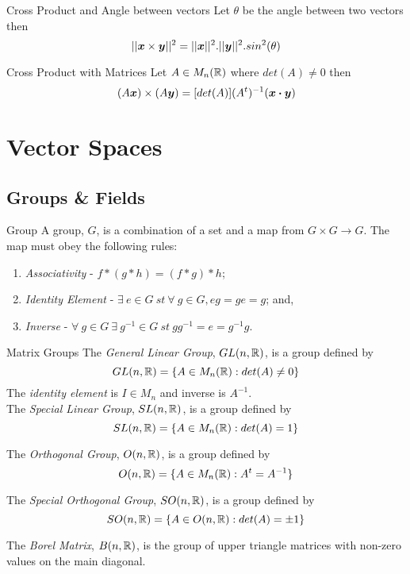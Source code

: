 \documentclass[11pt,a4paper]{article}
\begin{document}
\subtitle{Theorem 6.17 - }{Cross Product and Angle between vectors}
Let $\theta$ be the angle between two vectors then
$$||\boldsymbol{x} \times  \boldsymbol{y}||^2 = ||\boldsymbol{x}||^2.||\boldsymbol{y}||^2.sin^2(\theta)$$

\subtitle{Theorem 6.18 - }{Cross Product with Matrices}
Let $A \in M_n(\mathbb{R})$ where $det(A) \not = 0$ then
$$(A\boldsymbol{x}) \times (A\boldsymbol{y}) = [det(A)](A^t)^{-1}(\boldsymbol{x} \boldsymbol{\cdot} \boldsymbol{y})$$

\section{Vector Spaces}

\subsection{Groups \& Fields}

\subtitle{Definition 7.01 - }{Group}
A group, $G$, is a combination of a set and a map from $G \times G \to G$. The map must obey the following rules:
\begin{enumerate}[label=\roman*)]
  \item \textit{Associativity} - $f * (g * h) = (f * g) * h$;
  \item \textit{Identity Element} - $\exists\ e \in G\ st\ \forall\ g \in G, eg = ge = g$; and,
  \item \textit{Inverse} - $\forall\ g \in G\ \exists\ g^{-1} \in G\ st\ gg^{-1} = e = g^{-1}g$.
\end{enumerate}

\subtitle{Definition 7.02 - }{Matrix Groups}
The \textit{General Linear Group}, $GL(n, \mathbb{R})$, is a group defined by $$GL(n ,\mathbb{R}) = \{A \in M_n(\mathbb{R}) : det(A) \not = 0\}$$
The \textit{identity element} is $I \in M_n$ and inverse is $A^{-1}$. \\

The \textit{Special Linear Group}, $SL(n, \mathbb{R})$, is a group defined by $$SL(n ,\mathbb{R}) = \{A \in M_n(\mathbb{R}) : det(A) = 1\}$$

The \textit{Orthogonal Group}, $O(n, \mathbb{R})$, is a group defined by $$O(n ,\mathbb{R}) = \{A \in M_n(\mathbb{R}) : A^t = A^{-1}\}$$

The \textit{Special Orthogonal Group}, $SO(n, \mathbb{R})$, is a group defined by $$SO(n ,\mathbb{R}) = \{A \in O(n, \mathbb{R}) : det(A) = \pm 1\}$$

The \textit{Borel Matrix}, $B(n, \mathbb{R})$, is the group of upper triangle matrices with non-zero values on the main diagonal.\\
\end{document}
